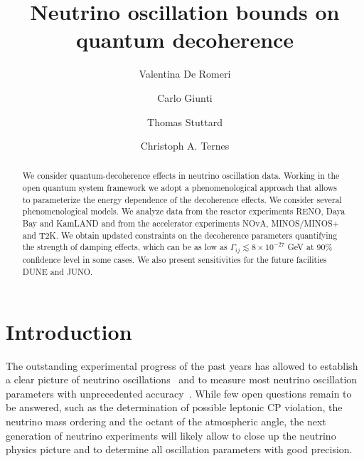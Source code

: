 \documentclass[aps, prd, onecolumn, tightenlines, notitlepage, superscriptaddress, nofootinbib, preprintnumbers, floatfix,showkeys,11pt]{revtex4-2}
\begin{document}
\title{{\LARGE Neutrino oscillation bounds on  quantum decoherence}}
\author{Valentina De Romeri}

\author{Carlo Giunti}

\author{Thomas Stuttard}

\author{Christoph A. Ternes}



\begin{abstract}
We consider quantum-decoherence effects in neutrino oscillation data. Working in the open quantum system framework we adopt a phenomenological approach that allows to parameterize the energy dependence of the decoherence effects. We consider several phenomenological models. We analyze data from the reactor experiments RENO, Daya Bay and KamLAND and from the accelerator experiments NOvA, MINOS/MINOS+ and T2K. We obtain updated constraints on the decoherence parameters quantifying the strength of damping effects, which can be as low as $\Gamma_{ij} \lesssim 8 \times 10^{-27}$ GeV at 90\% confidence level in some cases. We also present sensitivities for the future facilities DUNE and JUNO.
\end{abstract}
\maketitle


\section{Introduction}

The outstanding experimental progress of the past years has allowed to establish a clear picture of neutrino oscillations~\cite{Kajita:2016cak,McDonald:2016ixn} and to measure most neutrino oscillation parameters with unprecedented accuracy~\cite{deSalas:2020pgw,Esteban:2020cvm,Capozzi:2021fjo}. While few open questions remain to be answered, such as the determination of possible leptonic CP violation, the neutrino mass ordering and the octant of the atmospheric angle, the next generation of neutrino experiments will likely allow to close up the neutrino physics picture and to determine all oscillation parameters with good precision.
\end{document}
